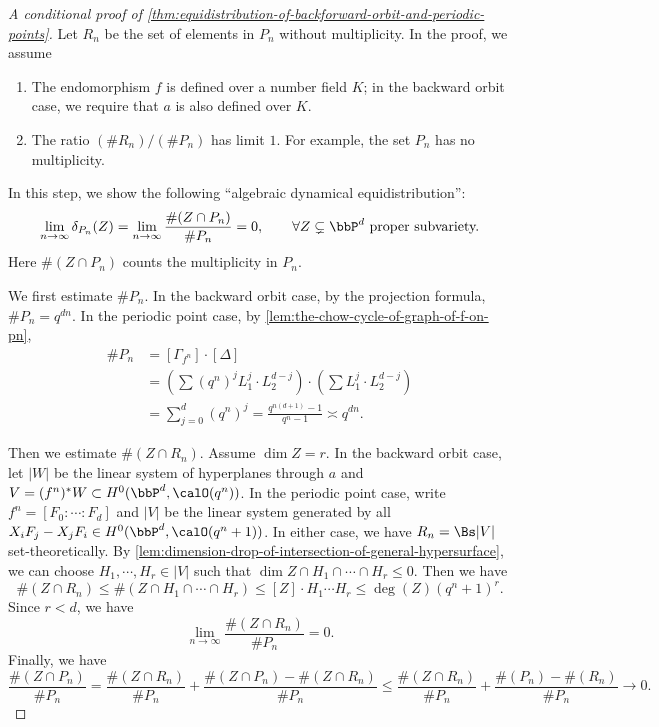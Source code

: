 \begin{proof}[A conditional proof of \cref{thm:equidistribution-of-backforward-orbit-and-periodic-points}]
	Let $R_n$ be the set of elements in $P_n$ without multiplicity.
	In the proof, we assume
	\begin{enumerate}[nosep]
		\item The endomorphism $f$ is defined over a number field $K$; in the backward orbit case, we require that $a$ is also defined over $K$.
		\item The ratio $(\# R_n)/(\# P_n)$ has limit $1$.
		      For example, the set $P_n$ has no multiplicity.
	\end{enumerate}

	\begin{step}\label{step:algebraic-equidistribution-in-thm:equidistribution-of-backforward-orbit-and-periodic-points}
		In this step, we show the following ``algebraic dynamical equidistribution'':
		\[ \lim_{n\to \infty} \delta_{P_n}(Z) = \lim_{n\to \infty} \frac{\#(Z \cap P_n)}{\# P_n} = 0, \qquad \forall Z \subsetneq \bbP^d \text{ proper subvariety.} \]
		Here $\#(Z \cap P_n)$ counts the multiplicity in $P_n$.
	\end{step}

	We first estimate $\# P_n$.
	In the backward orbit case, by the projection formula, $\# P_n = q^{dn}$.
	In the periodic point case, by \cref{lem:the-chow-cycle-of-graph-of-f-on-pn},
	\begin{align*}
		\# P_n & = [\Gamma_{f^n}] \cdot [\Delta]                                                                       \\
		       & = \left(\sum (q^n)^j L_1^{j} \cdot L_2^{d-j} \right) \cdot \left(\sum L_1^{j} \cdot L_2^{d-j} \right) \\
		       & = \sum_{j = 0}^{d} (q^n)^j = \frac{q^{n(d+1)} - 1}{q^n - 1} \asymp q^{dn}.
	\end{align*}

	Then we estimate $\#(Z \cap R_n)$.
	Assume $\dim Z = r$.
	In the backward orbit case, let $|W|$ be the linear system of hyperplanes through $a$ and $V = (f^n)^*W \subset H^0(\bbP^{d},\calO(q^n))$.
	In the periodic point case, write $f^n = [F_0:\cdots :F_d]$ and $|V|$ be the linear system generated by all $X_iF_j - X_jF_i \in H^0(\bbP^{d},\calO(q^n+1))$.
	In either case, we have $R_n = \Bs |V|$ set-theoretically.
	By \cref{lem:dimension-drop-of-intersection-of-general-hypersurface}, we can choose $H_1,\cdots,H_r \in |V|$ such that $\dim Z \cap H_1 \cap \cdots \cap H_r \leq 0$.
	Then we have
	\[ \#(Z \cap R_n) \leq \#(Z \cap H_1 \cap \cdots \cap H_r) \leq [Z]\cdot H_1 \cdots H_r \leq \deg(Z) (q^n+1)^r. \]
	Since $r < d$, we have
	\[ \lim_{n\to \infty} \frac{\#(Z \cap R_n)}{\# P_n} = 0. \]
	Finally, we have
	\[  \frac{\#(Z \cap P_n)}{\# P_n} =  \frac{\#(Z \cap R_n)}{\# P_n} + \frac{\#(Z \cap P_n) - \#(Z \cap R_n)}{\# P_n} \leq  \frac{\#(Z \cap R_n)}{\# P_n} + \frac{\#(P_n) - \#(R_n)}{\# P_n} \to 0.\]


\end{proof}
